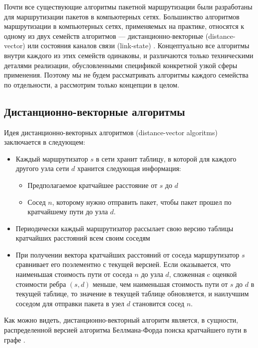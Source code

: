 \documentclass[specification,annotation,times]{itmo-student-thesis}
\theoremstyle{definition}
\begin{document}
Почти все существующие алгоритмы пакетной маршрутизации были разработаны для
маршрутизации пакетов в компьютерных сетях. Большинство алгоритмов маршрутизации
в компьютерных сетях, применяемых на практике, относятся к одному из двух
семейств алгоритмов --- дистанционно-векторные (distance-vector) \cite{arpanet-orig} или
состояния каналов связи (link-state) \cite{link-state-arpanet}.
Концептуально все алгоритмы внутри каждого из этих семейств одинаковы, и различаются только
техническими деталями реализации, обусловленными спецификой конкретной узкой
сферы применения. Поэтому мы не будем рассматривать алгоритмы каждого семейства
по отдельности, а рассмотрим только концепции в целом.

\subsection{Дистанционно-векторные алгоритмы}

Идея дистанционно-векторных алгоритмов (distance-vector algoritms) заключается в
следующем:

\begin{itemize}
\item Каждый маршрутизатор $s$ в сети хранит таблицу, в которой для каждого другого узла
  сети $d$ хранится следующая информация:
  \begin{itemize}
  \item Предполагаемое кратчайшее расстояние от $s$ до $d$
  \item Сосед $n$, которому нужно отправить пакет, чтобы пакет прошел по
    кратчайшему пути до узла $d$.
  \end{itemize}
\item Периодически каждый маршрутизатор рассылает свою версию таблицы кратчайших
  расстояний всем своим соседям
\item При получении вектора кратчайших расстояний от соседа маршрутизатор $s$
  сравнивает его поэлементно с текущей версией. Если оказывается, что наименьшая
  стоимость пути от соседа $n$ до узла $d$, сложенная c оценкой стоимости ребра
  $(s, d)$ меньше, чем наименьшая стоимость пути от $s$ до $d$ в текущей
  таблице, то значение в текущей таблице обновляется, и наилучшим соседом для
  отправки пакета в узел $d$ становится сосед $n$.
\end{itemize}

Как можно видеть, дистанционно-векторный алгоритм является, в сущности,
распределенной версией алгоритма Беллмана-Форда поиска кратчайшего пути в
графе \cite{bellman-ford}.
\end{document}
